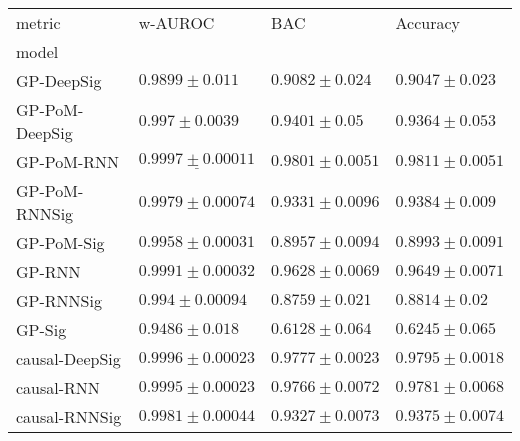 \begin{tabular}{llll}
\toprule
metric &                                          w-AUROC &                                            BAC &                                     Accuracy \\
model          &                                                  &                                                &                                              \\
\midrule
GP-DeepSig     &                             $ 0.9899 \pm 0.011 $ &                           $ 0.9082 \pm 0.024 $ &                         $ 0.9047 \pm 0.023 $ \\
GP-PoM-DeepSig &                             $ 0.997 \pm 0.0039 $ &                            $ 0.9401 \pm 0.05 $ &                         $ 0.9364 \pm 0.053 $ \\
GP-PoM-RNN     &            $  \underline{ 0.9997 \pm 0.00011 } $ &                          $ 0.9801 \pm 0.0051 $ &                        $ 0.9811 \pm 0.0051 $ \\
GP-PoM-RNNSig  &                           $ 0.9979 \pm 0.00074 $ &                          $ 0.9331 \pm 0.0096 $ &                         $ 0.9384 \pm 0.009 $ \\
GP-PoM-Sig     &                           $ 0.9958 \pm 0.00031 $ &                          $ 0.8957 \pm 0.0094 $ &                        $ 0.8993 \pm 0.0091 $ \\
GP-RNN         &                           $ 0.9991 \pm 0.00032 $ &                          $ 0.9628 \pm 0.0069 $ &                        $ 0.9649 \pm 0.0071 $ \\
GP-RNNSig      &                            $ 0.994 \pm 0.00094 $ &                           $ 0.8759 \pm 0.021 $ &                          $ 0.8814 \pm 0.02 $ \\
GP-Sig         &                             $ 0.9486 \pm 0.018 $ &                           $ 0.6128 \pm 0.064 $ &                         $ 0.6245 \pm 0.065 $ \\
causal-DeepSig &                           $ 0.9996 \pm 0.00023 $ &                          $ 0.9777 \pm 0.0023 $ &                        $ 0.9795 \pm 0.0018 $ \\
causal-RNN     &                           $ 0.9995 \pm 0.00023 $ &                          $ 0.9766 \pm 0.0072 $ &                        $ 0.9781 \pm 0.0068 $ \\
causal-RNNSig  &                           $ 0.9981 \pm 0.00044 $ &                          $ 0.9327 \pm 0.0073 $ &                        $ 0.9375 \pm 0.0074 $ \\

\end{tabular}
